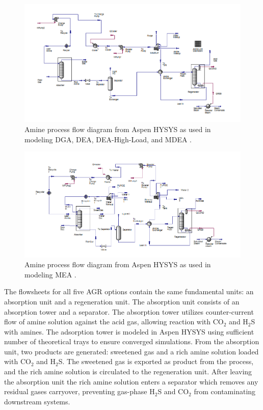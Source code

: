 \documentclass[11pt]{report}
\begin{document}
\begin{figure}
\includegraphics[width=1.2\columnwidth]{images/Aspen_AGR_general.png}
\caption{Amine process flow diagram from Aspen HYSYS as used in modeling DGA, DEA, DEA-High-Load, and MDEA \cite{Aspentech2016}.}
\label{fig:Aspen_AGR_general}
\end{figure}

\begin{figure}
\includegraphics[width=1.2\columnwidth]{images/Aspen_AGR_MEA.png}
\caption{Amine process flow diagram from Aspen HYSYS as used in modeling MEA \cite{Aspentech2016}.}
\label{fig:Aspen_AGR_MEA}
\end{figure}

The flowsheets for all five AGR options contain the same fundamental units: an absorption unit and a regeneration unit. The absorption unit consists of an absorption tower and a separator. The absorption tower utilizes counter-current flow of amine solution against the acid gas, allowing reaction with CO$_2$ and H$_2$S with amines. The adsorption tower is modeled in Aspen HYSYS using sufficient number of theoretical trays to ensure converged simulations. From the absorption unit, two products are generated: sweetened gas and a rich amine solution loaded with CO$_2$ and H$_2$S. The sweetened gas is exported as product from the process, and the rich amine solution is circulated to the regeneration unit. After leaving the absorption unit the rich amine solution enters a separator which removes any residual gases carryover, preventing gas-phase H$_2$S and CO$_2$ from contaminating downstream systems.
\end{document}
